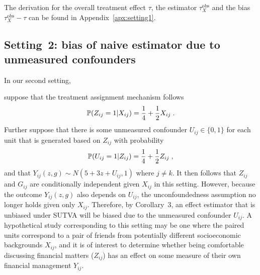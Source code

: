 \documentclass[10pt]{article}
\begin{document}
The derivation for the overall treatment effect $\tau$, the estimator $\tau_{X}^\text{obs}$ and the bias $\tau_{X}^\text{obs}-\tau$ can be found in Appendix~\ref{apx:setting1}.

\subsection{Setting~2: bias of naive estimator due to unmeasured confounders}

In our second setting,
\iffalse
suppose that the covariates are jointly generated according to the distribution
\[
\P(X_{i1}=x_1,X_{i2}=x_2) =
\begin{cases}
\frac{3}{8} & \text{for }x_1=x_2 \\
\frac{1}{8} & \text{for }x_1\neq x_2
\end{cases} \;,
\]
i.e., a homophily situation where the units are more likely to be paired with another unit that has similar characteristics. Further
\fi
suppose that the treatment assignment mechanism follows
\[
\P(Z_{ij}=1|X_{ij}) = \frac{1}{4} + \frac{1}{2}X_{ij} \;.
\]
Further suppose that there is some unmeasured confounder $U_{ij}\in\{0,1\}$ for each unit that is generated based on $Z_{ij}$ with probability
\[
\P(U_{ij}=1|Z_{ij}) = \frac{1}{4} + \frac{1}{2}Z_{ij}\;,
\]
and that $Y_{ij}(z,g)\sim N(5+3z+U_{ij},1)$ where $j\neq k$. It then follows that $Z_{ij}$ and $G_{ij}$ are conditionally independent given $X_{ij}$ in this setting. However, because the outcome $Y_{ij}(z,g)$ also depends on $U_{ij}$, the unconfoundedness assumption no longer holds given only $X_{ij}$. Therefore, by Corollary~3, an effect estimator that is unbiased under SUTVA will be biased due to the unmeasured confounder $U_{ij}$. \todo A hypothetical study corresponding to this setting may be one where the paired units correspond to a pair of friends from potentially different socioeconomic backgrounds $X_{ij}$, and it is of interest to determine whether being comfortable discussing financial matters ($Z_{ij}$) has an effect on some measure of their own financial management $Y_{ij}$.
\\

\end{document}
